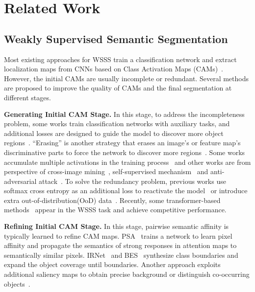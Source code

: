 \documentclass[10pt,twocolumn,letterpaper]{article}
\begin{document}
\section{Related Work}
\label{sec:relatedwork}
\subsection{Weakly Supervised Semantic Segmentation}

Most existing approaches for WSSS train a classification network and extract localization maps from CNNs based on Class Activation Maps (CAMs)~\cite{cam}. However, the initial CAMs are usually incomplete or redundant. Several methods are proposed to improve the quality of CAMs and the final segmentation at different stages.

\textbf{Generating Initial CAM Stage.} In this stage, to address the incompleteness problem, some works train classification networks with auxiliary tasks, and additional losses are designed to guide the model to discover more object regions~\cite{Chang2020sc-cam,Wang2020SEAM,Ru2021LearningVW,Xu2021LeveragingAT}. ``Erasing'' is another strategy that erases an image's or feature map's discriminative parts to force the network to discover more regions~\cite{Kweon2021UnlockingTP,Wei2017ObjectRM,Hou2018SelfErasingNF}. Some works accumulate multiple activations in the training process~\cite{Jiang2019OOA,kim2021discriminative,Yao2021NSROM} and other works are from perspective of cross-image mining~\cite{Sun2020MCIS,Fan2020CIANCA,Li2021GroupWiseSM,Wu2021EmbeddedDA}, self-supervised mechanism~\cite{Chen_2022_CVPR_SIPE,Wang2020SEAM} and anti-adversarial attack~\cite{Lee2021advcam}. To solve the redundancy problem, previous works use softmax cross entropy as an additional loss to reactivate the model~\cite{recam} or introduce extra out-of-distribution(OoD) data~\cite{lee2022w--ood}. Recently, some transformer-based methods~\cite{xu2022mctformer, AFA} appear in the WSSS task and achieve competitive performance.

\textbf{Refining Initial CAM Stage.} In this stage, pairwise semantic affinity is typically learned to refine CAM maps. PSA~\cite{Ahn2018PSA} trains a network to learn pixel affinity and propagate the semantics of strong responses in attention maps to semantically similar pixels. IRNet~\cite{Ahn2019IRN} and BES~\cite{Chen2020bes} synthesize class boundaries and expand the object coverage until boundaries. Another approach exploits additional saliency maps to obtain precise background or distinguish co-occurring objects~\cite{Lee2021EPS,Fan2020ICD,jiang2022l2g}.
\end{document}
